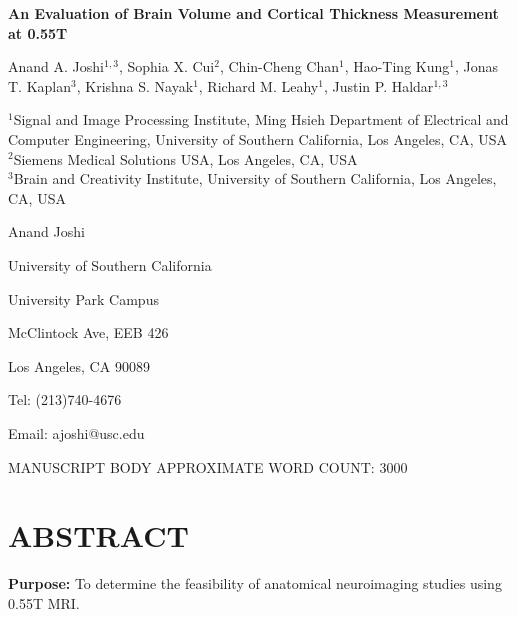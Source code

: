 \documentclass[12pt,letterpaper,onecolumn]{article}
\begin{document}
\begin{center}
{\LARGE\bf An Evaluation of Brain Volume and Cortical Thickness Measurement at 0.55T}
\end{center}
 
\vfill

\noindent Anand A. Joshi$^{1,3}$, Sophia X. Cui$^2$, Chin-Cheng Chan$^1$, Hao-Ting Kung$^1$, Jonas T. Kaplan$^3$, Krishna S. Nayak$^1$, Richard M. Leahy$^1$,  Justin P. Haldar$^{1,3}$

    
\vfill
\vspace{.1in}


\begin{singlespace}
    \noindent $^1$Signal and Image Processing Institute, Ming Hsieh Department of Electrical and Computer Engineering, University of Southern California, Los Angeles, CA, USA\\

	\noindent $^2$Siemens Medical Solutions USA, Los Angeles, CA, USA\\

	\noindent $^3$Brain and Creativity Institute, University of Southern California, Los Angeles, CA, USA
\end{singlespace}

\vfill 

\begin{singlespace}
	\vspace{.25in}
		
	\noindent Anand Joshi
			
	\noindent University of Southern California
	
	\noindent University Park Campus
	
	 McClintock Ave,  EEB 426
	
	\noindent Los Angeles, CA 90089
	
	\noindent Tel: (213)740-4676
	
	\noindent Email: ajoshi@usc.edu
\end{singlespace}

\vfill

\noindent MANUSCRIPT BODY APPROXIMATE WORD COUNT:  3000

\newpage


\section*{ABSTRACT}

\noindent \textbf{Purpose:} To determine the feasibility of anatomical neuroimaging studies using 0.55T MRI.
\end{document}
